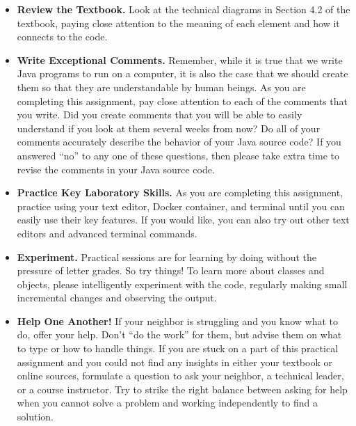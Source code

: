 \documentclass[11pt]{article}
\begin{document}
\vspace*{-.05in}
\begin{itemize}

\item {\bf Review the Textbook.} Look at the technical diagrams in Section 4.2
  of the textbook, paying close attention to the meaning of each element and how
  it connects to the code.

\item {\bf Write Exceptional Comments.} Remember, while it is true that we write
  Java programs to run on a computer, it is also the case that we should create
  them so that they are understandable by human beings. As you are completing
  this assignment, pay close attention to each of the comments that you write.
  Did you create comments that you will be able to easily understand if you look
  at them several weeks from now? Do all of your comments accurately describe
  the behavior of your Java source code? If you answered ``no'' to any one of
  these questions, then please take extra time to revise the comments in your
  Java source code.

\item {\bf Practice Key Laboratory Skills.} As you are completing this
  assignment, practice using your text editor, Docker container, and terminal
  until you can easily use their key features. If you would like, you can also
  try out other text editors and advanced terminal commands.

\item {\bf Experiment.} Practical sessions are for learning by doing without the
  pressure of letter grades. So try things! To learn more about classes and
  objects, please intelligently experiment with the code, regularly making small
  incremental changes and observing the output.

\item {\bf Help One Another!} If your neighbor is struggling and you know what
  to do, offer your help. Don't ``do the work'' for them, but advise them on
  what to type or how to handle things. If you are stuck on a part of this
  practical assignment and you could not find any insights in either your
  textbook or online sources, formulate a question to ask your neighbor, a
  technical leader, or a course instructor. Try to strike the right balance
  between asking for help when you cannot solve a problem and working
  independently to find a solution.

\end{itemize}
\end{document}

